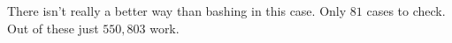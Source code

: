 There isn't really a better way than bashing in this case.
Only $81$ cases to check. Out of these just $550, 803$ work.
